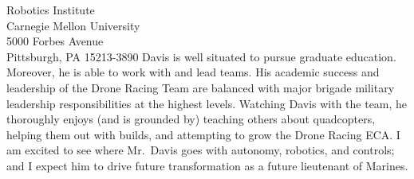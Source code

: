 \documentclass[10pt]{wrceletter}
\begin{document}
\begin{letter}{%
Robotics Institute\\
Carnegie Mellon University\\
5000 Forbes Avenue\\
Pittsburgh, PA 15213-3890}
Davis is well situated to pursue graduate education. Moreover, he is able to work with and lead teams.  His academic success and leadership of the Drone Racing Team are balanced with major brigade military leadership responsibilities at the highest levels. Watching Davis with the team, he thoroughly enjoys (and is grounded by) teaching others about quadcopters, helping them out with builds, and attempting to grow the Drone Racing ECA.  I am excited to see where Mr.~Davis goes with autonomy, robotics, and controls; and I expect him to drive future transformation as a future lieutenant of Marines.

\closing{~} %

\end{letter}
\end{document}
